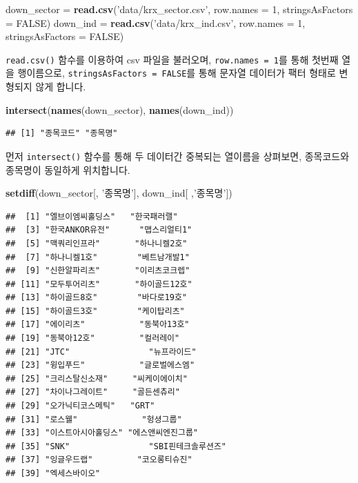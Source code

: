 \documentclass[12pt,]{book}
\newenvironment{Shaded}{\begin{snugshade}}{\end{snugshade}}
\newcommand{\DataTypeTok}[1]{\textcolor[rgb]{0.13,0.29,0.53}{#1}}
\newcommand{\DecValTok}[1]{\textcolor[rgb]{0.00,0.00,0.81}{#1}}
\newcommand{\KeywordTok}[1]{\textcolor[rgb]{0.13,0.29,0.53}{\textbf{#1}}}
\newcommand{\NormalTok}[1]{#1}
\newcommand{\OtherTok}[1]{\textcolor[rgb]{0.56,0.35,0.01}{#1}}
\newcommand{\StringTok}[1]{\textcolor[rgb]{0.31,0.60,0.02}{#1}}
\begin{document}
\begin{Shaded}
\begin{Highlighting}[]
\NormalTok{down_sector =}\StringTok{ }\KeywordTok{read.csv}\NormalTok{(}\StringTok{'data/krx_sector.csv'}\NormalTok{, }\DataTypeTok{row.names =} \DecValTok{1}\NormalTok{,}
                       \DataTypeTok{stringsAsFactors =} \OtherTok{FALSE}\NormalTok{)}
\NormalTok{down_ind =}\StringTok{ }\KeywordTok{read.csv}\NormalTok{(}\StringTok{'data/krx_ind.csv'}\NormalTok{,  }\DataTypeTok{row.names =} \DecValTok{1}\NormalTok{,}
                    \DataTypeTok{stringsAsFactors =} \OtherTok{FALSE}\NormalTok{)}
\end{Highlighting}
\end{Shaded}

\texttt{read.csv()} 함수를 이용하여 csv 파일을 불러오며, \texttt{row.names\ =\ 1}를 통해 첫번째 열을 행이름으로, \texttt{stringsAsFactors\ =\ FALSE}를 통해 문자열 데이터가 팩터 형태로 변형되지 않게 합니다.

\begin{Shaded}
\begin{Highlighting}[]
\KeywordTok{intersect}\NormalTok{(}\KeywordTok{names}\NormalTok{(down_sector), }\KeywordTok{names}\NormalTok{(down_ind))}
\end{Highlighting}
\end{Shaded}

\begin{verbatim}
## [1] "종목코드" "종목명"
\end{verbatim}

먼저 \texttt{intersect()} 함수를 통해 두 데이터간 중복되는 열이름을 상펴보면, 종목코드와 종목명이 동일하게 위치합니다.

\begin{Shaded}
\begin{Highlighting}[]
\KeywordTok{setdiff}\NormalTok{(down_sector[, }\StringTok{'종목명'}\NormalTok{], down_ind[ ,}\StringTok{'종목명'}\NormalTok{])}
\end{Highlighting}
\end{Shaded}

\begin{verbatim}
##  [1] "엘브이엠씨홀딩스"   "한국패러랠"        
##  [3] "한국ANKOR유전"      "맵스리얼티1"       
##  [5] "맥쿼리인프라"       "하나니켈2호"       
##  [7] "하나니켈1호"        "베트남개발1"       
##  [9] "신한알파리츠"       "이리츠코크렙"      
## [11] "모두투어리츠"       "하이골드12호"      
## [13] "하이골드8호"        "바다로19호"        
## [15] "하이골드3호"        "케이탑리츠"        
## [17] "에이리츠"           "동북아13호"        
## [19] "동북아12호"         "컬러레이"          
## [21] "JTC"                "뉴프라이드"        
## [23] "윙입푸드"           "글로벌에스엠"      
## [25] "크리스탈신소재"     "씨케이에이치"      
## [27] "차이나그레이트"     "골든센츄리"        
## [29] "오가닉티코스메틱"   "GRT"               
## [31] "로스웰"             "헝셩그룹"          
## [33] "이스트아시아홀딩스" "에스앤씨엔진그룹"  
## [35] "SNK"                "SBI핀테크솔루션즈" 
## [37] "잉글우드랩"         "코오롱티슈진"      
## [39] "엑세스바이오"
\end{verbatim}
\end{document}
